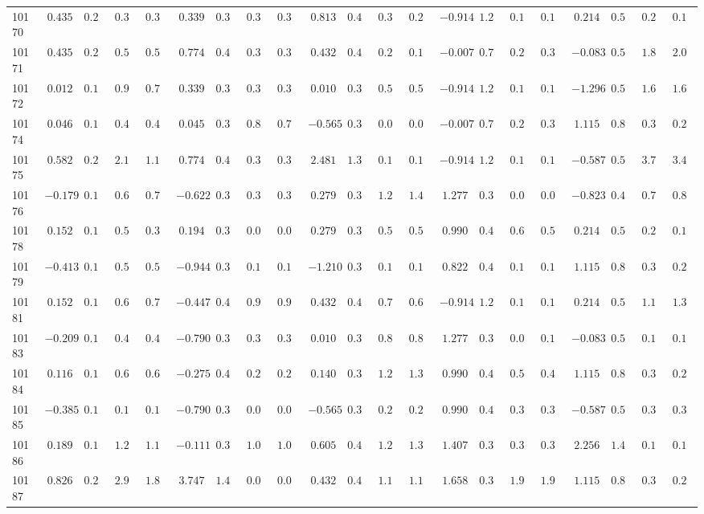 \documentclass[6pt]{article}
\begin{document}
\begin{landscape}
{\begin{longtable}{lrrrrrrrrrrrrrrrrrrrr}
10170&$ 0.435$&$0.216$&$0.331$&$0.341$&$ 0.339$&$0.388$&$0.339$&$0.339$&$ 0.813$&$0.497$&$0.318$&$0.249$&$-0.914$&$1.254$&$0.135$&$0.149$&$ 0.214$&$0.594$&$0.256$&$0.188$\tabularnewline
10171&$ 0.435$&$0.216$&$0.568$&$0.585$&$ 0.774$&$0.401$&$0.317$&$0.325$&$ 0.432$&$0.415$&$0.202$&$0.149$&$-0.007$&$0.714$&$0.299$&$0.321$&$-0.083$&$0.547$&$1.865$&$2.092$\tabularnewline
10172&$ 0.012$&$0.184$&$0.999$&$0.735$&$ 0.339$&$0.388$&$0.336$&$0.333$&$ 0.010$&$0.363$&$0.536$&$0.587$&$-0.914$&$1.254$&$0.135$&$0.149$&$-1.296$&$0.509$&$1.656$&$1.655$\tabularnewline
10174&$ 0.046$&$0.186$&$0.467$&$0.460$&$ 0.045$&$0.393$&$0.810$&$0.799$&$-0.565$&$0.334$&$0.044$&$0.045$&$-0.007$&$0.714$&$0.299$&$0.321$&$ 1.115$&$0.851$&$0.303$&$0.292$\tabularnewline
10175&$ 0.582$&$0.233$&$2.160$&$1.196$&$ 0.774$&$0.401$&$0.317$&$0.325$&$ 2.481$&$1.316$&$0.105$&$0.119$&$-0.914$&$1.254$&$0.135$&$0.149$&$-0.587$&$0.505$&$3.794$&$3.400$\tabularnewline
10176&$-0.179$&$0.176$&$0.651$&$0.702$&$-0.622$&$0.399$&$0.340$&$0.354$&$ 0.279$&$0.393$&$1.286$&$1.460$&$ 1.277$&$0.383$&$0.045$&$0.047$&$-0.823$&$0.499$&$0.796$&$0.836$\tabularnewline
10178&$ 0.152$&$0.192$&$0.554$&$0.392$&$ 0.194$&$0.389$&$0.058$&$0.058$&$ 0.279$&$0.393$&$0.537$&$0.513$&$ 0.990$&$0.414$&$0.669$&$0.586$&$ 0.214$&$0.594$&$0.256$&$0.188$\tabularnewline
10179&$-0.413$&$0.169$&$0.513$&$0.532$&$-0.944$&$0.376$&$0.155$&$0.162$&$-1.210$&$0.340$&$0.129$&$0.119$&$ 0.822$&$0.443$&$0.131$&$0.133$&$ 1.115$&$0.851$&$0.303$&$0.292$\tabularnewline
10181&$ 0.152$&$0.192$&$0.669$&$0.743$&$-0.447$&$0.403$&$0.984$&$0.992$&$ 0.432$&$0.415$&$0.764$&$0.654$&$-0.914$&$1.254$&$0.135$&$0.149$&$ 0.214$&$0.594$&$1.183$&$1.322$\tabularnewline
10183&$-0.209$&$0.175$&$0.441$&$0.436$&$-0.790$&$0.389$&$0.316$&$0.340$&$ 0.010$&$0.363$&$0.863$&$0.820$&$ 1.277$&$0.383$&$0.098$&$0.109$&$-0.083$&$0.547$&$0.104$&$0.101$\tabularnewline
10184&$ 0.116$&$0.190$&$0.662$&$0.648$&$-0.275$&$0.402$&$0.257$&$0.253$&$ 0.140$&$0.376$&$1.263$&$1.339$&$ 0.990$&$0.414$&$0.528$&$0.497$&$ 1.115$&$0.851$&$0.303$&$0.292$\tabularnewline
10185&$-0.385$&$0.170$&$0.159$&$0.141$&$-0.790$&$0.389$&$0.054$&$0.055$&$-0.565$&$0.334$&$0.295$&$0.282$&$ 0.990$&$0.414$&$0.383$&$0.393$&$-0.587$&$0.505$&$0.339$&$0.307$\tabularnewline
10186&$ 0.189$&$0.195$&$1.271$&$1.106$&$-0.111$&$0.398$&$1.043$&$1.019$&$ 0.605$&$0.448$&$1.257$&$1.383$&$ 1.407$&$0.376$&$0.389$&$0.301$&$ 2.256$&$1.456$&$0.164$&$0.191$\tabularnewline
10187&$ 0.826$&$0.269$&$2.906$&$1.891$&$ 3.747$&$1.435$&$0.083$&$0.086$&$ 0.432$&$0.415$&$1.176$&$1.163$&$ 1.658$&$0.376$&$1.921$&$1.937$&$ 1.115$&$0.851$&$0.303$&$0.292$\tabularnewline

\end{longtable}}
\end{landscape}
\end{document}
